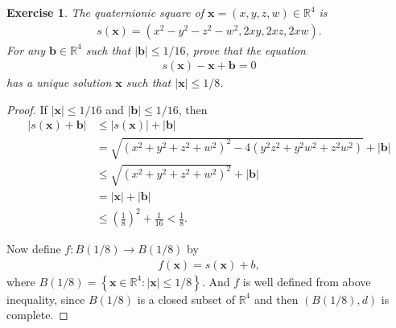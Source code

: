 \documentclass[11pt]{article}
\newtheorem{exercise}{Exercise}[section]
\theoremstyle{definition}
\numberwithin{equation}{subsection}
\begin{document}
\medskip

\begin{exercise}{\rm *}
The quaternionic square of $\mathbf{x} = (x,y,z,w) \in \mathbb{R}^4$ is 
\begin{align*}
    s(\mathbf{x}) = \left( x^2 - y^2 - z^2 - w^2, 2xy, 2xz, 2xw \right).
\end{align*}
For any $\mathbf{b} \in \mathbb{R}^4$ such that $\left|\mathbf{b}\right| \leq 1/16$, prove that the equation
\begin{align*}
    s(\mathbf{x}) - \mathbf{x} + \mathbf{b} = 0
\end{align*}
has a unique solution $\mathbf{x}$ such that $\left|\mathbf{x}\right| \leq 1/8$.
\end{exercise}
\begin{proof}
If $\left|\mathbf{x}\right| \leq 1/16$  and $\left|\mathbf{b}\right| \leq 1/16$, then 
\begin{align*}
    |s(\mathbf{x}) + \mathbf{b}| & \leq |s(\mathbf{x})| + |\mathbf{b}| \\
    & = \sqrt{(x^2 + y^2 + z^2 + w^2)^2 - 4(y^2z^2 + y^2w^2 + z^2w^2)} + |\mathbf{b}| \\
    & \leq \sqrt{(x^2 + y^2 + z^2 + w^2)^2} + |\mathbf{b}| \\
    & = |\mathbf{x}| + |\mathbf{b}| \\
    & \leq \left(\frac{1}{8}\right)^2 + \frac{1}{16} < \frac{1}{8}.
\end{align*}

Now define $f:B(1/8) \to B(1/8)$ by
\begin{align*}
    f(\mathbf{x}) = s(\mathbf{x}) + b,
\end{align*}
where $B(1/8) = \left\{ \mathbf{x} \in \mathbb{R}^4 : \left|\mathbf{x}\right| \leq 1/8 \right\}$. And $f$ is well defined from above inequality, since $B(1/8)$ is a closed subset of $\mathbb{R}^4$ and then $(B(1/8), d)$ is complete. 


\end{proof}
\end{document}
